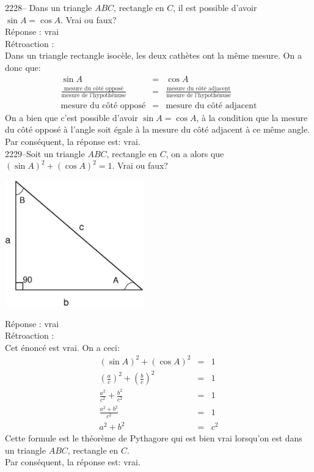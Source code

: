 \documentclass[letterpaper, 12pt]{article}
\begin{document}
2228-- Dans un triangle $ABC$, rectangle en $C$, il est possible d'avoir $\sin{A}=\cos{A}$. Vrai ou faux?\\

R\'eponse : vrai\\

R\'etroaction :\\
Dans un triangle rectangle isoc\`ele, les deux cath\`etes ont la m\^eme mesure. On a donc que:
\begin{eqnarray*}
 \sin{A}&=&\cos{A}\\[2mm]
\frac{\textrm{mesure du c\^ot\'e oppos\'e}}{\textrm{mesure de l'hypoth\'enuse}}&=&\frac{\textrm{mesure du c\^ot\'e adjacent}}{\textrm{mesure de l'hypoth\'enuse}} \\[2mm]
\textrm{mesure du c\^ot\'e oppos\'e}&=&\textrm{mesure du c\^ot\'e adjacent}
\end{eqnarray*}
On a bien que c'est possible d'avoir $\sin{A}=\cos{A}$, \`a la condition que la mesure du c\^ot\'e oppos\'e \`a l'angle soit \'egale \`a la mesure du c\^ot\'e adjacent \`a ce m\^eme angle.\\
Par cons\'equent, la r\'eponse est: vrai.\\

2229--Soit un triangle $ABC$, rectangle en $C$, on a alors que $\left( \sin{A}\right)^{2}+\left(\cos{A}\right)^{2}=1$. Vrai ou faux? \\
\begin{center}
 \includegraphics[width=6cm,bb=14 14 580 527]{Triangle_rectangle2.eps}
\end{center}

R\'eponse : vrai\\

R\'etroaction :\\
Cet \'enonc\'e est vrai. On a ceci:
\begin{eqnarray*}
 \left( \sin{A}\right)^{2}+\left(\cos{A}\right)^{2}&=&1\\[2mm]
 \left( \frac{a}{c}\right)^{2}+\left(\frac{b}{c}\right)^{2}&=&1\\[2mm]
\frac{a^{2}}{c^{2}}+\frac{b^{2}}{c^{2}}&=&1\\[2mm]
\frac{a^{2}+b^{2}}{c^{2}}&=&1\\[2mm]
a^{2}+b^{2}&=&c^{2}
\end{eqnarray*}
Cette formule est le th\'eor\`eme de Pythagore qui est bien vrai lorsqu'on est dans un triangle $ABC$, rectangle en $C$.\\
Par cons\'equent, la r\'eponse est: vrai.\\
\end{document}
